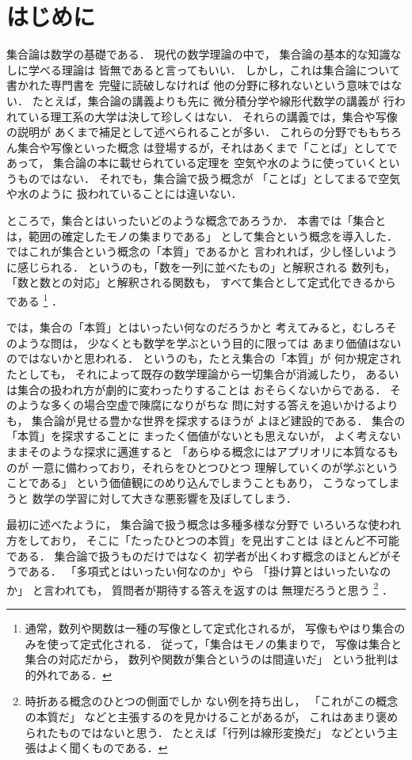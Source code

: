 \chapter{はじめに}

集合論は数学の基礎である．
現代の数学理論の中で，
集合論の基本的な知識なしに学べる理論は
皆無であると言ってもいい．
しかし，これは集合論について書かれた専門書を
完璧に読破しなければ
他の分野に移れないという意味ではない．
たとえば，集合論の講義よりも先に
微分積分学や線形代数学の講義が
行われている理工系の大学は決して珍しくはない．
それらの講義では，集合や写像の説明が
あくまで補足として述べられることが多い．
これらの分野でももちろん集合や写像といった概念
は登場するが，それはあくまで「ことば」としてであって，
集合論の本に載せられている定理を
空気や水のように使っていくというものではない．
それでも，集合論で扱う概念が
「ことば」としてまるで空気や水のように
扱われていることには違いない．


ところで，集合とはいったいどのような概念であろうか．
本書では「集合とは，範囲の確定したモノの集まりである」
として集合という概念を導入した．
ではこれが集合という概念の「本質」であるかと
言われれば，少し怪しいように感じられる．
というのも，「数を一列に並べたもの」と解釈される
数列も，「数と数との対応」と解釈される関数も，
すべて集合として定式化できるからである
\footnote{%
  通常，数列や関数は一種の写像として定式化されるが，
  写像もやはり集合のみを使って定式化される．
  従って，「集合はモノの集まりで，
  写像は集合と集合の対応だから，
  数列や関数が集合というのは間違いだ」
  という批判は的外れである．
}%
．


では，集合の「本質」とはいったい何なのだろうかと
考えてみると，むしろそのような問は，
少なくとも数学を学ぶという目的に限っては
あまり価値はないのではないかと思われる．
というのも，たとえ集合の「本質」が
何か規定されたとしても，
それによって既存の数学理論から一切集合が消滅したり，
あるいは集合の扱われ方が劇的に変わったりすることは
おそらくないからである．
そのような多くの場合空虚で陳腐になりがちな
問に対する答えを追いかけるよりも，
集合論が見せる豊かな世界を探求するほうが
よほど建設的である．
集合の「本質」を探求することに
まったく価値がないとも思えないが，
よく考えないままそのような探求に邁進すると
「あらゆる概念にはアプリオリに本質なるものが
一意に備わっており，それらをひとつひとつ
理解していくのが学ぶということである」
という価値観にのめり込んでしまうこともあり，
こうなってしまうと
数学の学習に対して大きな悪影響を及ぼしてしまう．


最初に述べたように，
集合論で扱う概念は多種多様な分野で
いろいろな使われ方をしており，
そこに「たったひとつの本質」を見出すことは
ほとんど不可能である．
集合論で扱うものだけではなく
初学者が出くわす概念のほとんどがそうである．
「多項式とはいったい何なのか」やら
「掛け算とはいったいなのか」
と言われても，
質問者が期待する答えを返すのは
無理だろうと思う
\footnote{%
  時折ある概念のひとつの側面でしか
  ない例を持ち出し，
  「これがこの概念の本質だ」
  などと主張するのを見かけることがあるが，
  これはあまり褒められたものではないと思う．
  たとえば「行列は線形変換だ」
  などという主張はよく聞くものである．
}%
．


